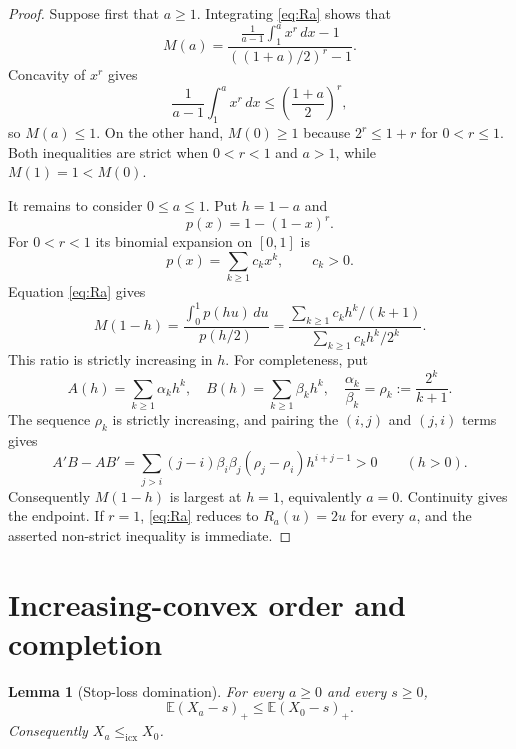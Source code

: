 \documentclass[11pt]{article}
\newtheorem{lemma}[theorem]{Lemma}
\newcommand{\E}{\mathbb E}
\newcommand{\icx}{\mathrm{icx}}
\begin{document}
\begin{proof}
Suppose first that $a\ge1$.  Integrating \eqref{eq:Ra} shows that
\[
 M(a)=
 \frac{\displaystyle
       \frac1{a-1}\int_1^a x^r\,dx-1}
      {\displaystyle ((1+a)/2)^r-1}.
\]
Concavity of $x^r$ gives
\[
 \frac1{a-1}\int_1^a x^r\,dx
 \le \left(\frac{1+a}{2}\right)^r,
\]
so $M(a)\le1$.  On the other hand, $M(0)\ge1$ because
$2^r\le1+r$ for $0<r\le1$.  Both inequalities are strict when
$0<r<1$ and $a>1$, while $M(1)=1<M(0)$.

It remains to consider $0\le a\le1$.  Put $h=1-a$ and
\[
 p(x)=1-(1-x)^r.
\]
For $0<r<1$ its binomial expansion on $[0,1]$ is
\[
 p(x)=\sum_{k\ge1}c_kx^k,\qquad c_k>0.
\]
Equation \eqref{eq:Ra} gives
\begin{equation}\label{eq:seriesratio}
 M(1-h)=
 \frac{\displaystyle\int_0^1p(hu)\,du}{p(h/2)}
 =
 \frac{\displaystyle\sum_{k\ge1}c_kh^k/(k+1)}
      {\displaystyle\sum_{k\ge1}c_kh^k/2^k}.
\end{equation}
This ratio is strictly increasing in $h$.  For completeness, put
\[
 A(h)=\sum_{k\ge1}\alpha_kh^k,\quad
 B(h)=\sum_{k\ge1}\beta_kh^k,\quad
 \frac{\alpha_k}{\beta_k}=\rho_k:=\frac{2^k}{k+1}.
\]
The sequence $\rho_k$ is strictly increasing, and pairing the $(i,j)$ and
$(j,i)$ terms gives
\[
 A'B-AB'
 =
 \sum_{j>i}(j-i)\beta_i\beta_j
 (\rho_j-\rho_i)h^{i+j-1}>0
 \qquad(h>0).
\]
Consequently $M(1-h)$ is largest at $h=1$, equivalently $a=0$.
Continuity gives the endpoint.  If $r=1$, \eqref{eq:Ra} reduces to
$R_a(u)=2u$ for every $a$, and the asserted non-strict inequality is
immediate.
\end{proof}

\section{Increasing-convex order and completion}

\begin{lemma}[Stop-loss domination]\label{lem:icx}
For every $a\ge0$ and every $s\ge0$,
\[
 \E(X_a-s)_+\le \E(X_0-s)_+.
\]
Consequently $X_a\le_{\icx}X_0$.
\end{lemma}
\end{document}
